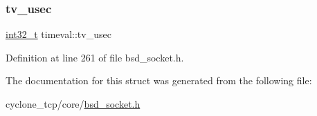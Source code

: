 \subsubsection{\texorpdfstring{tv\+\_\+usec}{tv\_usec}}
{\footnotesize\ttfamily \hyperlink{stdint_8h_ab1967d8591af1a4e48c37fd2b0f184d0}{int32\+\_\+t} timeval\+::tv\+\_\+usec}



Definition at line 261 of file bsd\+\_\+socket.\+h.



The documentation for this struct was generated from the following file\+:\begin{DoxyCompactItemize}
\item 
cyclone\+\_\+tcp/core/\hyperlink{bsd__socket_8h}{bsd\+\_\+socket.\+h}\end{DoxyCompactItemize}
